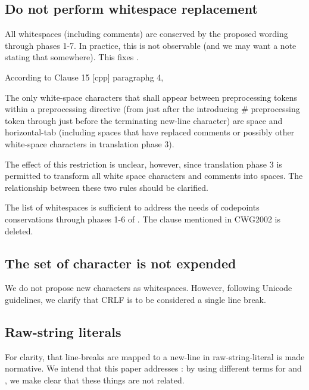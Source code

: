 \documentclass{wg21}
\begin{document}
\subsection{Do not perform whitespace replacement}

All whitespaces (including comments) are conserved by the proposed wording through phases 1-7.
In practice, this is not observable (and we may want a note stating that somewhere).
This fixes .

\begin{quoteblock}
According to Clause 15 [cpp] paragraphg 4,

\begin{quoteblock}
The only white-space characters that shall appear between preprocessing tokens within a preprocessing directive (from just after the introducing \# preprocessing token through just before the terminating new-line character) are space and horizontal-tab (including spaces that have replaced comments or possibly other white-space characters in translation phase 3).
\end{quoteblock}
The effect of this restriction is unclear, however, since translation phase 3 is permitted to transform all white space characters and comments into spaces. The relationship between these two rules should be clarified.
\end{quoteblock}

The list of whitespaces is sufficient to address the needs of
codepoints conservations through phases 1-6 of .
The clause mentioned in CWG2002 is deleted.

\subsection{The set of character is not expended}

We do not propose new characters as whitespaces.
However, following Unicode guidelines, we clarify that CRLF is to be considered a single line break.

\subsection{Raw-string literals}

For clarity, that line-breaks are mapped to a new-line in raw-string-literal is made normative.
We intend that this paper addresses : by using different terms for  and , we make clear that these things are not related.  
\end{document}
